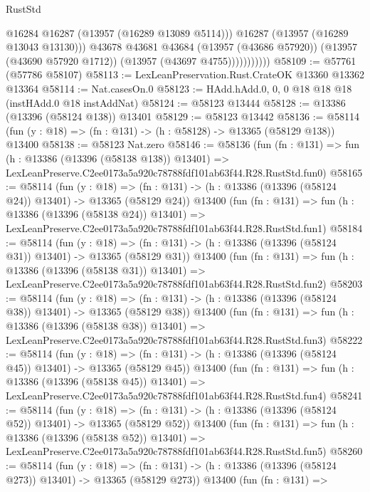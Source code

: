 \begin{lexlean}{RustStd}
\begin{coremodule}
                          @16284
                          @16287
                          (@13957 (@16289 @13089 @5114)))
                        @16287
                        (@13957 (@16289 @13043 @13130)))
                      @43678
                      @43681
                      @43684
                      (@13957 (@43686 @57920))
                      (@13957 (@43690 @57920 @1712))
                      (@13957 (@43697 @4755)))))))))))
@58109 := @57761 (@57786 @58107)
@58113 := LexLeanPreservation.Rust.CrateOK @13360 @13362 @13364
@58114 := Nat.casesOn.{0}
@58123 := HAdd.hAdd.{0, 0, 0} @18 @18 @18 (instHAdd.{0} @18 instAddNat)
@58124 := @58123 @13444
@58128 := @13386 (@13396 (@58124 @138)) @13401
@58129 := @58123 @13442
@58136 := @58114 (fun (y : @18) => (fn : @131) -> (h : @58128) -> @13365 (@58129 @138)) @13400
@58138 := @58123 Nat.zero
@58146 := @58136
    (fun (fn : @131) =>
    fun (h : @13386 (@13396 (@58138 @138)) @13401) =>
    LexLeanPreserve.C2ee0173a5a920c78788fdf101ab63f44.R28.RustStd.fun0)
@58165 := @58114
    (fun (y : @18) =>
    (fn : @131) -> (h : @13386 (@13396 (@58124 @24)) @13401) -> @13365 (@58129 @24))
    @13400
    (fun (fn : @131) =>
    fun (h : @13386 (@13396 (@58138 @24)) @13401) =>
    LexLeanPreserve.C2ee0173a5a920c78788fdf101ab63f44.R28.RustStd.fun1)
@58184 := @58114
    (fun (y : @18) =>
    (fn : @131) -> (h : @13386 (@13396 (@58124 @31)) @13401) -> @13365 (@58129 @31))
    @13400
    (fun (fn : @131) =>
    fun (h : @13386 (@13396 (@58138 @31)) @13401) =>
    LexLeanPreserve.C2ee0173a5a920c78788fdf101ab63f44.R28.RustStd.fun2)
@58203 := @58114
    (fun (y : @18) =>
    (fn : @131) -> (h : @13386 (@13396 (@58124 @38)) @13401) -> @13365 (@58129 @38))
    @13400
    (fun (fn : @131) =>
    fun (h : @13386 (@13396 (@58138 @38)) @13401) =>
    LexLeanPreserve.C2ee0173a5a920c78788fdf101ab63f44.R28.RustStd.fun3)
@58222 := @58114
    (fun (y : @18) =>
    (fn : @131) -> (h : @13386 (@13396 (@58124 @45)) @13401) -> @13365 (@58129 @45))
    @13400
    (fun (fn : @131) =>
    fun (h : @13386 (@13396 (@58138 @45)) @13401) =>
    LexLeanPreserve.C2ee0173a5a920c78788fdf101ab63f44.R28.RustStd.fun4)
@58241 := @58114
    (fun (y : @18) =>
    (fn : @131) -> (h : @13386 (@13396 (@58124 @52)) @13401) -> @13365 (@58129 @52))
    @13400
    (fun (fn : @131) =>
    fun (h : @13386 (@13396 (@58138 @52)) @13401) =>
    LexLeanPreserve.C2ee0173a5a920c78788fdf101ab63f44.R28.RustStd.fun5)
@58260 := @58114
    (fun (y : @18) =>
    (fn : @131) -> (h : @13386 (@13396 (@58124 @273)) @13401) -> @13365 (@58129 @273))
    @13400
    (fun (fn : @131) =>

\end{coremodule}
\end{lexlean}
